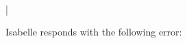 \begin{isabellebody}
\begin{isamarkuptext}
\end{isamarkuptext}  
 \\%
\\%
\hspace*{2ex}\\%
|\hspace*{1.5ex}\\
\begin{isamarkuptext}

\noindent Isabelle responds with the following error:


\end{isamarkuptext}
\end{isabellebody}
